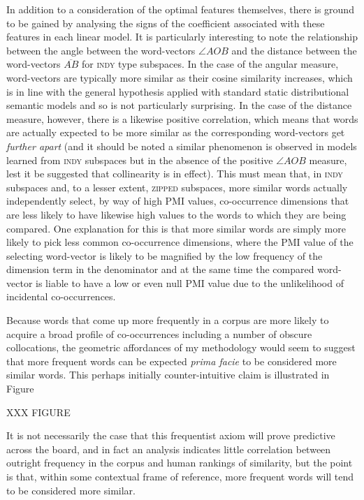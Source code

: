 In addition to a consideration of the optimal features themselves, there is ground to be gained by analysing the signs of the coefficient associated with these features in each linear model.  It is particularly interesting to note the relationship between the angle between the word-vectors $\angle AOB$ and the distance between the word-vectors $\overline{AB}$ for \textsc{indy} type subspaces.  In the case of the angular measure, word-vectors are typically more similar as their cosine similarity increases, which is in line with the general hypothesis applied with standard static distributional semantic models and so is not particularly surprising.  In the case of the distance measure, however, there is a likewise positive correlation, which means that words are actually expected to be more similar as the corresponding word-vectors get \emph{further apart} (and it should be noted a similar phenomenon is observed in models learned from \textsc{indy} subspaces but in the absence of the positive $\angle AOB$ measure, lest it be suggested that collinearity is in effect).  This must mean that, in \textsc{indy} subspaces and, to a lesser extent, \textsc{zipped} subspaces, more similar words actually independently select, by way of high PMI values, co-occurrence dimensions that are less likely to have likewise high values to the words to which they are being compared.  One explanation for this is that more similar words are simply more likely to pick less common co-occurrence dimensions, where the PMI value of the selecting word-vector is likely to be magnified by the low frequency of the dimension term in the denominator and at the same time the compared word-vector is liable to have a low or even null PMI value due to the unlikelihood of incidental co-occurrences.

Because words that come up more frequently in a corpus are more likely to acquire a broad profile of co-occurrences including a number of obscure collocations, the geometric affordances of my methodology would seem to suggest that more frequent words can be expected \emph{prima facie} to be considered more similar words.  This perhaps initially counter-intuitive claim is illustrated in Figure

XXX FIGURE

It is not necessarily the case that this frequentist axiom will prove predictive across the board, and in fact an analysis indicates little correlation between outright frequency in the corpus and human rankings of similarity, but the point is that, within some contextual frame of reference, more frequent words will tend to be considered more similar.

